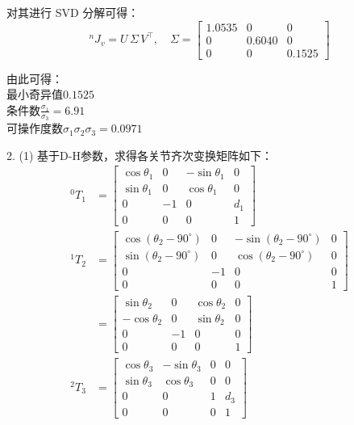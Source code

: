 \documentclass[UTF8, 13pt]{ctexart}
\begin{document}
对其进行 SVD 分解可得：
\[
{}^n J_v = U\, \Sigma\, V^{\top},\quad
\Sigma = \begin{bmatrix}
            1.0535 & 0 & 0 \\
            0 & 0.6040 & 0 \\
            0 & 0 & 0.1525
        \end{bmatrix}
\]

由此可得： \\
最小奇异值\(0.1525\) \\
条件数\(\frac{\sigma_1}{\sigma_3} = 6.91\) \\
可操作度数\(\sigma_1 \sigma_2 \sigma_3 = 0.0971\)
\newpage



2.
(1)
基于D-H参数，求得各关节齐次变换矩阵如下：
\[
\begin{aligned}
    {}^0 T_1 &= \begin{bmatrix}
                    \cos\theta_1 & 0 & -\sin\theta_1 & 0 \\
                    \sin\theta_1 & 0 & \cos\theta_1 & 0 \\
                    0 & -1 & 0 & d_1 \\
                    0 & 0 & 0 & 1
                \end{bmatrix} \\
    {}^1 T_2 &= \begin{bmatrix}
                    \cos(\theta_2 - 90^\circ) & 0 & -\sin(\theta_2 - 90^\circ) & 0 \\
                    \sin(\theta_2 - 90^\circ) & 0 & \cos(\theta_2 - 90^\circ) & 0 \\
                    0 & -1 & 0 & 0 \\
                    0 & 0 & 0 & 1
                \end{bmatrix} \\
            &= \begin{bmatrix}
                    \sin\theta_2 & 0 & \cos\theta_2 & 0 \\
                    -\cos\theta_2 & 0 & \sin\theta_2 & 0 \\
                    0 & -1 & 0 & 0 \\
                    0 & 0 & 0 & 1
                \end{bmatrix} \\
    {}^2 T_3 &= \begin{bmatrix}
                    \cos\theta_3 & -\sin\theta_3 & 0 & 0 \\
                    \sin\theta_3 & \cos\theta_3 & 0 & 0 \\
                    0 & 0 & 1 & d_3 \\
                    0 & 0 & 0 & 1
                \end{bmatrix} \\
\end{aligned}
\]
\end{document}
